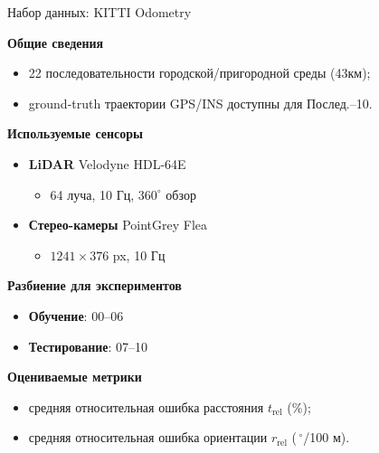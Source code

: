 \documentclass{beamer} %
\begin{document}
\begin{frame}{Набор данных: KITTI Odometry}
  \footnotesize{

  \textbf{Общие сведения}
  \begin{itemize}
      \item 22 последовательности городской/пригородной среды (\;43км);
      \item ground-truth траектории GPS/INS доступны для Послед.–10.
  \end{itemize}

  \vspace{0.4cm}

  \textbf{Используемые сенсоры}
  \begin{itemize}
      \item \textbf{LiDAR} Velodyne HDL-64E  
            \begin{itemize}\item 64 луча, 10 Гц, $360^{\circ}$ обзор\end{itemize}
      \item \textbf{Стерео-камеры} PointGrey Flea
            \begin{itemize}\item $1241\times376$ px, 10 Гц\end{itemize}
  \end{itemize}

  \vspace{0.4cm}

  \textbf{Разбиение для экспериментов}
  \begin{itemize}
      \item \textbf{Обучение}: 00–06 
      \item \textbf{Тестирование}: 07–10
  \end{itemize}

  \vspace{0.4cm}

  \textbf{Оцениваемые метрики}
  \begin{itemize}
      \item средняя относительная ошибка расстояния
            $t_{\mathrm{rel}}$ (\%);
      \item средняя относительная ошибка ориентации
            $r_{\mathrm{rel}}$ (\,$^{\circ}$/100 м).
  \end{itemize}
  }
\end{frame}
\end{document}
